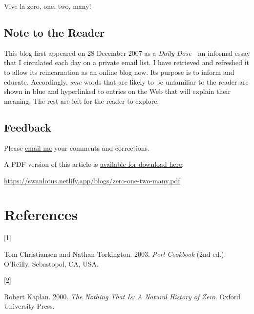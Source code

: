 \documentclass[
  a4paper,
]{article}
\newlength{\cslhangindent}
\newlength{\csllabelwidth}
\newlength{\cslentryspacingunit} %
\newenvironment{CSLReferences}[2] %
 {%
  \setlength{\parindent}{0pt}
  \ifodd #1
  \let\oldpar\par
  \def\par{\hangindent=\cslhangindent\oldpar}
  \fi
  \setlength{\parskip}{#2\cslentryspacingunit}
 }%
 {}
\newcommand{\CSLLeftMargin}[1]{\parbox[t]{\csllabelwidth}{#1}}
\newcommand{\CSLRightInline}[1]{\parbox[t]{\linewidth - \csllabelwidth}{#1}\break}
\begin{document}
Vive la zero, one, two, many!

\hypertarget{note-to-the-reader}{%
\subsection{Note to the Reader}\label{note-to-the-reader}}

This blog first appeared on 28 December 2007 as a \emph{Daily Dose}---an
informal essay that I circulated each day on a private email list. I
have retrieved and refreshed it to allow its reincarnation as an online
blog now. Its purpose is to inform and educate. Accordingly, \emph{sme}
words that are likely to be unfamiliar to the reader are shown in blue
and hyperlinked to entries on the Web that will explain their meaning.
The rest are left for the reader to explore.  \normalfont

\hypertarget{feedback}{%
\subsection{Feedback}\label{feedback}}

Please \href{mailto:feedback.swanlotus@gmail.com}{email me} your
comments and corrections.

\noindent A PDF version of this article is
\href{./zero-one-two-many.pdf}{available for download here}:

\begin{small}

\begin{sffamily}

\url{https://swanlotus.netlify.app/blogs/zero-one-two-many.pdf}

\end{sffamily}

\end{small}

\hypertarget{bibliography}{%
\section*{References}\label{bibliography}}

\hypertarget{refs}{}
\begin{CSLReferences}{0}{0}
\leavevmode{}%
\CSLLeftMargin{{[}1{]} }%
\CSLRightInline{Tom Christiansen and Nathan Torkington. 2003.
\emph{{Perl Cookbook}} (2nd ed.). O'Reilly, Sebastopol, CA, USA.}

\leavevmode{}%
\CSLLeftMargin{{[}2{]} }%
\CSLRightInline{Robert Kaplan. 2000. \emph{{The Nothing That Is: A
Natural History of Zero}}. Oxford University Press.}

\end{CSLReferences}
\end{document}
